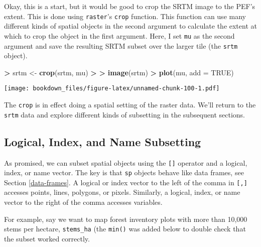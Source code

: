 \documentclass[]{krantz}
\makeatletter
\newenvironment{Shaded}{\begin{snugshade}}{\end{snugshade}}
\newcommand{\KeywordTok}[1]{\textcolor[rgb]{0.27,0.27,0.27}{\textbf{#1}}}
\newcommand{\DataTypeTok}[1]{\textcolor[rgb]{0.27,0.27,0.27}{#1}}
\newcommand{\StringTok}[1]{\textcolor[rgb]{0.5,0.5,0.5}{#1}}
\newcommand{\OtherTok}[1]{\textcolor[rgb]{0.37,0.37,0.37}{#1}}
\newcommand{\OperatorTok}[1]{\textcolor[rgb]{0.43,0.43,0.43}{\textbf{#1}}}
\newcommand{\ErrorTok}[1]{\textcolor[rgb]{0.14,0.14,0.14}{\textbf{#1}}}
\newcommand{\NormalTok}[1]{#1}
\newenvironment{kframe}{%
\medskip{}
\setlength{\fboxsep}{.8em}
 \def\at@end@of@kframe{}%
 \ifinner\ifhmode%
  \def\at@end@of@kframe{\end{minipage}}%
  \begin{minipage}{\columnwidth}%
 \fi\fi%
 \def\FrameCommand##1{\hskip\@totalleftmargin \hskip-\fboxsep
 \colorbox{shadecolor}{##1}\hskip-\fboxsep
     \hskip-\linewidth \hskip-\@totalleftmargin \hskip\columnwidth}%
 \MakeFramed {\advance\hsize-\width
   \@totalleftmargin\z@ \linewidth\hsize
   \@setminipage}}%
 {\par\unskip\endMakeFramed%
 \at@end@of@kframe}
\renewenvironment{Shaded}{\begin{kframe}}{\end{kframe}}
\theoremstyle{definition}
\theoremstyle{definition}
\theoremstyle{definition}
\theoremstyle{remark}
\makeatother
\begin{document}
Okay, this is a start, but it would be good to crop the SRTM image to
the PEF's extent. This is done using \texttt{raster}'s \texttt{crop}
function. This function can use many different kinds of spatial objects
in the second argument to calculate the extent at which to crop the
object in the first argument. Here, I set \texttt{mu} as the second
argument and save the resulting SRTM subset over the larger tile (the
\texttt{srtm} object).

\begin{Shaded}
\begin{Highlighting}[]
\OperatorTok{>}\StringTok{ }\NormalTok{srtm <-}\StringTok{ }\KeywordTok{crop}\NormalTok{(srtm, mu)}
\OperatorTok{>}\StringTok{ }
\ErrorTok{>}\StringTok{ }\KeywordTok{image}\NormalTok{(srtm)}
\OperatorTok{>}\StringTok{ }\KeywordTok{plot}\NormalTok{(mu, }\DataTypeTok{add =} \OtherTok{TRUE}\NormalTok{)}
\end{Highlighting}
\end{Shaded}

\texttt{[image: bookdown\_files/figure-latex/unnamed-chunk-100-1.pdf]}

The \texttt{crop} is in effect doing a spatial setting of the raster
data. We'll return to the \texttt{srtm} data and explore different kinds
of subsetting in the subsequent sections.

\subsection{Logical, Index, and Name
Subsetting}\label{logical-index-and-name-subsetting}

As promised, we can subset spatial objects using the \texttt{{[}{]}}
operator and a logical, index, or name vector. The key is that
\texttt{sp} objects behave like data frames, see Section
\ref{data-frames}. A logical or index vector to the left of the comma in
\texttt{{[},{]}} accesses points, lines, polygons, or pixels. Similarly,
a logical, index, or name vector to the right of the comma accesses
variables.

For example, say we want to map forest inventory plots with more than
10,000 stems per hectare, \texttt{stems\_ha} (the \texttt{min()} was
added below to double check that the subset worked correctly.

\begin{Shaded}
\end{Shaded}
\end{document}
